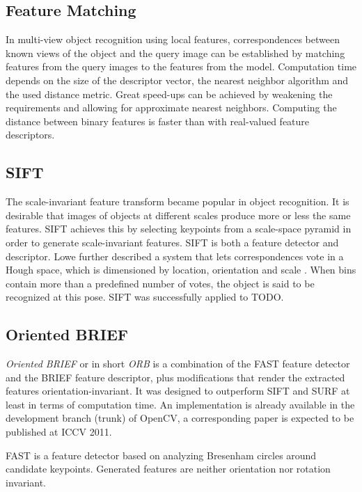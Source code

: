 \subsection{Feature Matching}

In multi-view object recognition using local features, correspondences between
known views of the object and the query image can be established by matching
features from the query images to the features from the model. Computation time
depends on the size of the descriptor vector, the nearest neighbor algorithm
and the used distance metric. Great speed-ups can be achieved by weakening the
requirements and allowing for approximate nearest neighbors. Computing the
distance between binary features is faster than with real-valued feature
descriptors.

\subsection{SIFT}

The scale-invariant feature transform became popular in object recognition.  It
is desirable that images of objects at different scales produce more or less
the same features. SIFT achieves this by selecting keypoints from a scale-space
pyramid in order to generate scale-invariant features. SIFT is both a feature
detector and descriptor. Lowe further described a system that lets
correspondences vote in a Hough space, which is dimensioned by location,
orientation and scale \cite{Lowe1999}. When bins contain more than a predefined
number of votes, the object is said to be recognized at this pose.  SIFT was
successfully applied to TODO.

\subsection{Oriented BRIEF}

{\it Oriented BRIEF} or in short {\it ORB} is a combination of the FAST feature
detector and the BRIEF feature descriptor, plus modifications that render the
extracted features orientation-invariant. It was designed to outperform SIFT
and SURF at least in terms of computation time. An implementation is already
available in the development branch (trunk) of OpenCV, a corresponding paper is
expected to be published at ICCV 2011.

FAST is a feature detector based on analyzing Bresenham circles around
candidate keypoints. Generated features are neither orientation nor rotation
invariant.

